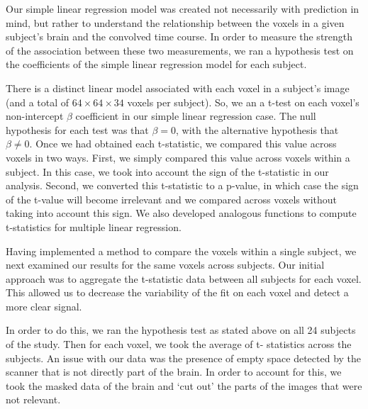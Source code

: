 
\par \indent Our simple linear regression model was created not necessarily 
with prediction in mind, but rather to understand the relationship between 
the voxels in a given subject's brain and the convolved time course. In order 
to measure the strength of the association between these two measurements, we 
ran a hypothesis test on the coefficients of the simple linear regression 
model for each subject.

\par There is a distinct linear model associated with each voxel in a 
subject’s image (and a total of $64 \times 64 \times 34$ voxels per subject). 
So, we an a t-test on each voxel's non-intercept $\beta$ coefficient in our 
simple linear regression case. The null hypothesis for each test was that $
\beta = 0$, with the alternative hypothesis that $\beta \neq 0$. Once we had 
obtained each t-statistic, we compared this value across voxels in two ways. 
First, we simply compared this value across voxels within a subject. In this 
case, we took into account the sign of the t-statistic in our analysis. 
Second, we converted this t-statistic to a p-value, in which case the sign of 
the t-value will become irrelevant and we compared across voxels without 
taking into account this sign.  We also developed analogous functions to 
compute t-statistics for multiple linear regression. 

\par Having implemented a  method to compare the voxels within a single 
subject, we next examined our results for the same voxels across subjects. 
Our initial approach was to aggregate the t-statistic data between all 
subjects for each voxel. This allowed us to decrease the variability of the 
fit on each voxel and detect a more clear signal. 

\par In order to do this, we ran the hypothesis test as stated above on all 
24 subjects of the study. Then for each voxel, we took the average of t-
statistics across the subjects. An issue with our data was the presence of 
empty space detected by the scanner that is not directly part of the brain. 
In order to account for this, we took the masked data of the brain and ‘cut 
out’ the parts of the images that were not relevant. 
